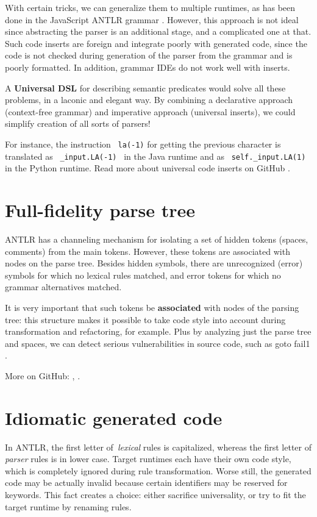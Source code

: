 \documentclass[sigplan,screen]{acmart}
\begin{document}
With certain tricks, we can generalize them to multiple runtimes, as has
been done in the JavaScript ANTLR grammar \cite{universal-javascript-grammar}.
However, this approach is not ideal since abstracting the
parser is an additional stage, and a complicated one at that. Such code
inserts are foreign and integrate poorly with generated code, since the
code is not checked during generation of the parser from the grammar and
is poorly formatted. In addition, grammar IDEs do not work well with
inserts.

A \textbf{Universal DSL} for describing semantic predicates would solve
all these problems, in a laconic and elegant way. By combining a
declarative approach (context-free grammar) and imperative approach
(universal inserts), we could simplify creation of all sorts of parsers!

For instance, the instruction ~\texttt{la(-1)} for getting the previous
character is translated as ~\texttt{\_input.LA(-1)}~ in the Java runtime
and as ~\texttt{self.\_input.LA(1)}~ in the Python runtime. Read more
about universal code inserts on GitHub \cite{universal-code-inserts}.

\section{Full-fidelity parse tree}

ANTLR has a channeling mechanism for isolating a set of hidden tokens
(spaces, comments) from the main tokens. However, these tokens are
associated with nodes on the parse tree. Besides hidden symbols, there
are unrecognized (error) symbols for which no lexical rules matched, and
error tokens for which no grammar alternatives matched.

It is very important that such tokens be \textbf{associated} with nodes
of the parsing tree: this structure makes it possible to take code style
into account during transformation and refactoring, for example. Plus by
analyzing just the parse tree and spaces, we can detect serious
vulnerabilities in source code, such as goto fail1 \cite{goto-fail-vulnerability}.

More on GitHub: \cite{full-fidelity-tree-tokens}, \cite{error-tokens}.

\section{Idiomatic generated code}

In ANTLR, the first letter of~\emph{lexical} rules is capitalized,
whereas the first letter of \emph{parser} rules is in lower case. Target
runtimes each have their own code style, which is completely ignored
during rule transformation. Worse still, the generated code may be
actually invalid because certain identifiers may be reserved for
keywords. This fact creates a choice: either sacrifice universality, or try to
fit the target runtime by renaming rules.
\end{document}
